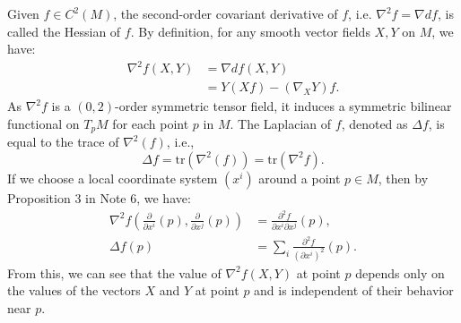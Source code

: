 \documentclass{ctexart}
\begin{document}


Given $f\in C^2(M)$, the second-order covariant derivative of $f$, i.e. $\nabla^2 f = \nabla df$, is called the Hessian of $f$. 
By definition, for any smooth vector fields $X, Y$ on $M$, we have:
$$
\begin{aligned}
\nabla^2 f(X, Y) &= \nabla df(X, Y) \\
&= Y(Xf) - (\nabla_X Y)f.
\end{aligned}
$$
As $\nabla^2 f$ is a $(0,2)$-order symmetric tensor field, 
it induces a symmetric bilinear functional on $T_p M$ for each point $p$ in $M$.
The Laplacian of $f$, denoted as $\Delta f$, is equal to the trace of $\nabla^2(f)$, i.e.,
$$
\Delta f = \text{tr}(\nabla^2(f)) = \text{tr}(\nabla^2 f).
$$
If we choose a local coordinate system $(x^i)$ around a point $p \in M$, then by Proposition 3 in Note 6, we have:
$$
\begin{aligned}
\nabla^2 f\left(\frac{\partial}{\partial x^i}(p), \frac{\partial}{\partial x^j}(p)\right) &= \frac{\partial^2 f}{\partial x^i \partial x^j}(p), \\
\Delta f(p) &= \sum_i \frac{\partial^2 f}{\left(\partial x^i\right)^2}(p).
\end{aligned}
$$
From this, we can see that the value of $\nabla^2 f(X, Y)$ at point $p$ depends only on the values of the vectors $X$ and $Y$ at point $p$ and is independent of their behavior near $p$.
\end{document}
